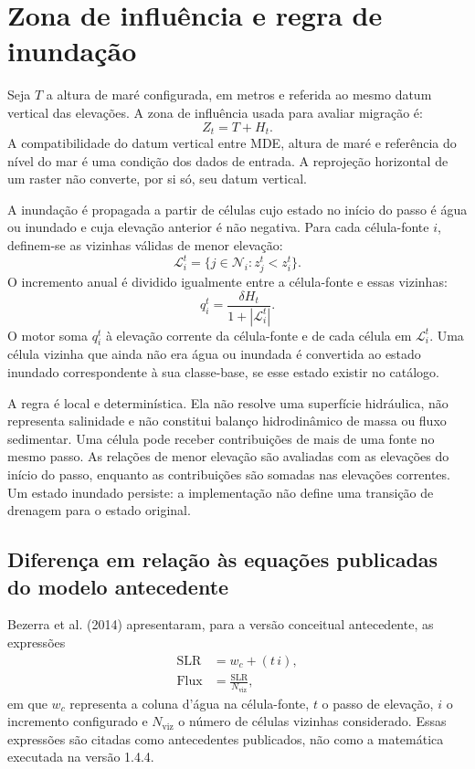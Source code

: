 \documentclass[11pt,a4paper]{article}
\begin{document}
\section{Zona de influência e regra de inundação}

Seja $T$ a altura de maré configurada, em metros e referida ao mesmo datum vertical das elevações. A zona de influência usada para avaliar migração é:
\begin{equation}
Z_t=T+H_t.
\label{eq:tidal-zone}
\end{equation}
A compatibilidade do datum vertical entre MDE, altura de maré e referência do nível do mar é uma condição dos dados de entrada. A reprojeção horizontal de um raster não converte, por si só, seu datum vertical.

A inundação é propagada a partir de células cujo estado no início do passo é água ou inundado e cuja elevação anterior é não negativa. Para cada célula-fonte $i$, definem-se as vizinhas válidas de menor elevação:
\begin{equation}
\mathcal{L}_i^t=\{j\in\mathcal{N}_i:
z_j^t<z_i^t\}.
\label{eq:lower-neighbors}
\end{equation}
O incremento anual é dividido igualmente entre a célula-fonte e essas vizinhas:
\begin{equation}
q_i^t=\frac{\delta H_t}{1+|\mathcal{L}_i^t|}.
\label{eq:local-increment}
\end{equation}
O motor soma $q_i^t$ à elevação corrente da célula-fonte e de cada célula em $\mathcal{L}_i^t$. Uma célula vizinha que ainda não era água ou inundada é convertida ao estado inundado correspondente à sua classe-base, se esse estado existir no catálogo.

A regra é local e determinística. Ela não resolve uma superfície hidráulica, não representa salinidade e não constitui balanço hidrodinâmico de massa ou fluxo sedimentar. Uma célula pode receber contribuições de mais de uma fonte no mesmo passo. As relações de menor elevação são avaliadas com as elevações do início do passo, enquanto as contribuições são somadas nas elevações correntes. Um estado inundado persiste: a implementação não define uma transição de drenagem para o estado original.

\subsection{Diferença em relação às equações publicadas do modelo antecedente}

Bezerra et al. (2014) apresentaram, para a versão conceitual antecedente, as expressões
\begin{align}
\mathrm{SLR} &= w_c + (t\,i), \label{eq:legacy-slr}\\
\mathrm{Flux} &= \frac{\mathrm{SLR}}{N_{\mathrm{viz}}}, \label{eq:legacy-flux}
\end{align}
em que $w_c$ representa a coluna d'água na célula-fonte, $t$ o passo de elevação, $i$ o incremento configurado e $N_{\mathrm{viz}}$ o número de células vizinhas considerado. Essas expressões são citadas como antecedentes publicados, não como a matemática executada na versão 1.4.4.
\end{document}
